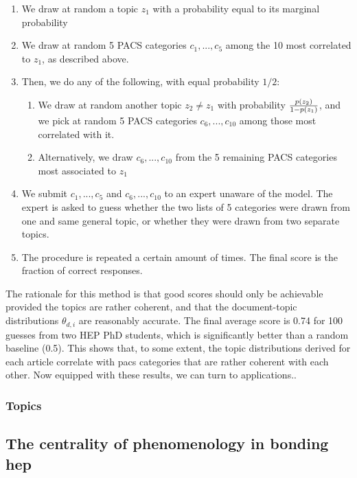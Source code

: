 \documentclass[smallextended]{svjour3}
\begin{document}
\begin{enumerate}
    \item We draw at random a topic $z_1$ with a probability equal to its marginal probability 
    \item We draw at random 5 PACS categories $c_1,...,c_5$ among the 10 most correlated to $z_1$, as described above.
    \item Then, we do any of the following, with equal probability $1/2$:
    \begin{enumerate}
        \item We draw at random another topic $z_2\neq z_1$ with probability $p(z_2)\over 1-p(z_1)$, and we pick at random 5 PACS categories $c_6,...,c_{10}$ among those most correlated with it.
        \item Alternatively, we draw  $c_6,...,c_{10}$ from the 5 remaining PACS categories most associated to $z_1$
    \end{enumerate}
    \item We submit $c_1, ..., c_5$ and $c_6, ..., c_{10}$ to an expert unaware of the model. The expert is asked to guess whether the two lists of 5 categories were drawn from one and same general topic, or whether they were drawn from two separate topics.
    \item The procedure is repeated a certain amount of times. The final score is the fraction of correct responses.
\end{enumerate}

The rationale for this method is that good scores should only be achievable provided the topics are rather coherent, and that the document-topic distributions $\theta_{d,i}$ are reasonably accurate. The final average score is 0.74 for 100 guesses from two HEP PhD students, which is significantly better than a random baseline (0.5). This shows that, to some extent, the topic distributions derived for each article correlate with \gls{pacs} categories that are rather coherent with each other. Now equipped with these results, we can turn to applications..


\subsubsection{Topics}


\fontsize{6}{7}\selectfont\normalsize
\fontsize{6}{7}\selectfont\normalsize

\subsection{\label{appendix:phenomenology_centrality}The centrality of phenomenology in bonding \gls{hep}}
\end{document}
